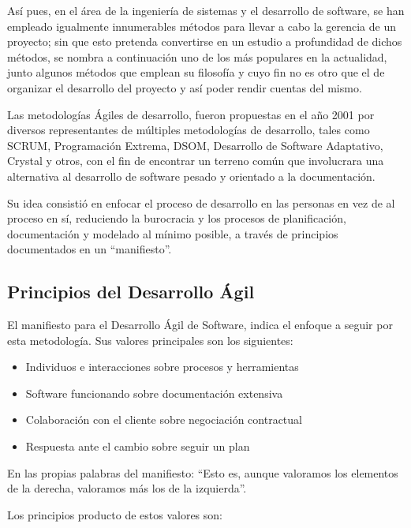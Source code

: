 Así pues, en el área de la ingeniería de sistemas y el desarrollo de software, se han empleado igualmente innumerables métodos para llevar a cabo la gerencia de un proyecto; sin que esto pretenda convertirse en un estudio a profundidad de dichos métodos, se nombra a continuación uno de los más populares en la actualidad, junto algunos métodos que emplean su filosofía y cuyo fin no es otro que el de organizar el desarrollo del proyecto y así poder rendir cuentas del mismo.

Las metodologías Ágiles de desarrollo, fueron propuestas en el año 2001 por diversos representantes de múltiples metodologías de desarrollo, tales como SCRUM, Programación Extrema, DSOM, Desarrollo de Software Adaptativo, Crystal y otros, con el fin de encontrar un terreno común que involucrara una alternativa al desarrollo de software pesado y orientado a la documentación.

Su idea consistió en enfocar el proceso de desarrollo en las personas en vez de al proceso en sí, reduciendo la burocracia y los procesos de planificación, documentación y modelado al mínimo posible, a través de principios documentados en un ``manifiesto''.

\subsection{Principios del Desarrollo Ágil}

El manifiesto para el Desarrollo Ágil de Software, indica el enfoque a seguir por esta metodología. Sus valores principales son los siguientes:

\begin{itemize}
	\itemsep1pt \parskip1pt 
	\item Individuos e interacciones sobre procesos y herramientas
	\item Software funcionando sobre documentación extensiva
	\item Colaboración con el cliente sobre negociación contractual
	\item Respuesta ante el cambio sobre seguir un plan
\end{itemize}

En las propias palabras del manifiesto: ``Esto es, aunque valoramos los elementos de la derecha,
valoramos más los de la izquierda''.\cite{agilemanifesto}

Los principios producto de estos valores son:\cite{agileprinciples}

